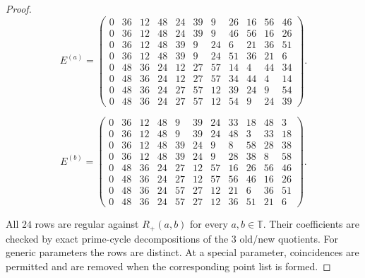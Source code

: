 \documentclass[11pt,a4paper]{article}
\theoremstyle{plain}
\theoremstyle{definition}
\theoremstyle{plain}
\begin{document}
\begin{proof}
\[
E^{(a)}=\begin{pmatrix}
0&36&12&48&24&39&9&26&16&56&46\\
0&36&12&48&24&39&9&46&56&16&26\\
0&36&12&48&39&9&24&6&21&36&51\\
0&36&12&48&39&9&24&51&36&21&6\\
0&48&36&24&12&27&57&14&4&44&34\\
0&48&36&24&12&27&57&34&44&4&14\\
0&48&36&24&27&57&12&39&24&9&54\\
0&48&36&24&27&57&12&54&9&24&39
\end{pmatrix}.
\]

\[
E^{(b)}=\begin{pmatrix}
0&36&12&48&9&39&24&33&18&48&3\\
0&36&12&48&9&39&24&48&3&33&18\\
0&36&12&48&39&24&9&8&58&28&38\\
0&36&12&48&39&24&9&28&38&8&58\\
0&48&36&24&27&12&57&16&26&56&46\\
0&48&36&24&27&12&57&56&46&16&26\\
0&48&36&24&57&27&12&21&6&36&51\\
0&48&36&24&57&27&12&36&51&21&6
\end{pmatrix}.
\]

All $24$ rows are regular against $R_+(a,b)$ for every $a,b\in\mathbb T$. Their coefficients are checked by exact prime-cycle decompositions of the 3 old/new quotients. For generic parameters the rows are distinct. At a special parameter, coincidences are permitted and are removed when the corresponding point list is formed.


\end{proof}
\end{document}
